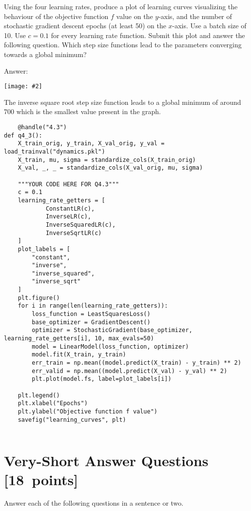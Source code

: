 \documentclass{article}
\newcommand{\blu}[1]{{\textcolor{blu}{#1}}}
\newenvironment{answer}{\par\begingroup\color{gre}Answer: }{\endgroup}
\let\ask\blu
\newcommand\pts[1]{\textcolor{pointscolour}{[#1~points]}}
\newcommand{\centerfig}[2]{\begin{center}\texttt{[image: \#2]}\end{center}}
\begin{document}
Using the four learning rates, produce a plot of learning curves visualizing the behaviour of the objective function $f$ value on the $y$-axis, and the number of stochastic gradient descent epochs (at least 50) on the $x$-axis. Use a batch size of 10. Use $c = 0.1$ for every learning rate function. \blu{Submit this plot and answer the following question. Which step size functions lead to the parameters converging towards a global minimum?}
\begin{answer}
\centerfig{.6}{./figs/learning_curves.png}
The inverse square root step size function leads to a global minimum of around 700 which is the smallest value present in the graph.
\end{answer}
\newpage
\begin{verbatim}
    @handle("4.3")
def q4_3():
    X_train_orig, y_train, X_val_orig, y_val = load_trainval("dynamics.pkl")
    X_train, mu, sigma = standardize_cols(X_train_orig)
    X_val, _, _ = standardize_cols(X_val_orig, mu, sigma)

    """YOUR CODE HERE FOR Q4.3"""
    c = 0.1
    learning_rate_getters = [
            ConstantLR(c),
            InverseLR(c),
            InverseSquaredLR(c),
            InverseSqrtLR(c)
    ]
    plot_labels = [
        "constant",
        "inverse",
        "inverse_squared",
        "inverse_sqrt"
    ]
    plt.figure()
    for i in range(len(learning_rate_getters)):
        loss_function = LeastSquaresLoss()
        base_optimizer = GradientDescent()
        optimizer = StochasticGradient(base_optimizer, learning_rate_getters[i], 10, max_evals=50)
        model = LinearModel(loss_function, optimizer)
        model.fit(X_train, y_train)
        err_train = np.mean((model.predict(X_train) - y_train) ** 2)
        err_valid = np.mean((model.predict(X_val) - y_val) ** 2)
        plt.plot(model.fs, label=plot_labels[i])
    
    plt.legend()
    plt.xlabel("Epochs")
    plt.ylabel("Objective function f value")
    savefig("learning_curves", plt)


\end{verbatim}


\clearpage
\section{Very-Short Answer Questions \pts{18}}

\ask{Answer each of the following questions in a sentence or two.}
\end{document}
